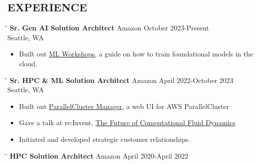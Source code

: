 \documentclass{res}
\begin{document}
\begin{resume}
\section{EXPERIENCE}
\vspace{-0.10in}
 \begin{tabbing}
   \hspace{2.5in}\= \hspace{2.6in}\= \kill %
    {\bf Sr. Gen AI Solution Architect} \>Amazon     \>October 2023-Present\\
                             \>Seattle, WA
   \end{tabbing}\vspace{-10pt}      %
   \begin{itemize}
   \setlength\itemsep{0em}
\item Built out \href{https://mlworkshops.com}{ML Workshops}, a guide on how to train foundational models in the cloud.
    \end{itemize}
\vspace{-0.10in}
 \begin{tabbing}
   \hspace{2.5in}\= \hspace{2.6in}\= \kill %
    {\bf Sr. HPC & ML Solution Architect} \>Amazon     \>April 2022-October 2023\\
                             \>Seattle, WA
   \end{tabbing}\vspace{-10pt}      %
   \begin{itemize}
   \setlength\itemsep{0em}
\item Built out \href{https://pcluster.cloud/}{ParallelCluster Manager}, a web UI for AWS ParallelCluster
\item Gave a talk at re:Invent, \href{https://swsmith.cc/slides/CMP208-CFD-in-Cloud.pdf}{The Future of Computational Fluid Dynamics}
\item Initiated and developed strategic customer relationships.
    \end{itemize}
\vspace{-0.10in}
 \begin{tabbing}
   \hspace{2.5in}\= \hspace{2.6in}\= \kill %
    {\bf HPC Solution Architect} \>Amazon     \>April 2020-April 2022\\

\end{tabbing}
\end{resume}
\end{document}
